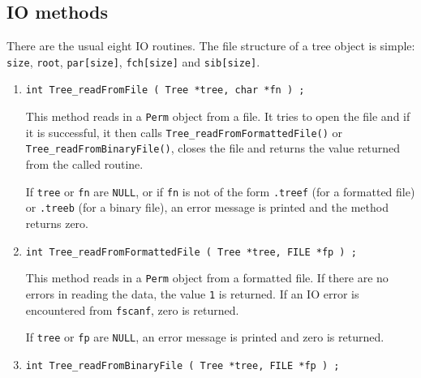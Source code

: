 \subsection{IO methods}
\label{subsection:Tree:proto:IO}
\par
There are the usual eight IO routines.
The file structure of a tree object is simple:
{\tt size},
{\tt root},
{\tt par[size]},
{\tt fch[size]} and
{\tt sib[size]}.
\par
\begin{enumerate}
\item
\begin{verbatim}
int Tree_readFromFile ( Tree *tree, char *fn ) ;
\end{verbatim}
\par
This method reads in a {\tt Perm} object from a file.
It tries to open the file and if it is successful, 
it then calls {\tt Tree\_readFromFormattedFile()} or
{\tt Tree\_readFromBinaryFile()}, 
closes the file
and returns the value returned from the called routine.
\par {}
If {\tt tree} or {\tt fn} are {\tt NULL}, 
or if {\tt fn} is not of the form
{\tt *.treef} (for a formatted file) 
or {\tt *.treeb} (for a binary file),
an error message is printed and the method returns zero.
\item
\begin{verbatim}
int Tree_readFromFormattedFile ( Tree *tree, FILE *fp ) ;
\end{verbatim}
\par
This method reads in a {\tt Perm} object from a formatted file.
If there are no errors in reading the data, 
the value {\tt 1} is returned.
If an IO error is encountered from {\tt fscanf}, zero is returned.
\par {}
If {\tt tree} or {\tt fp} are {\tt NULL}, 
an error message is printed and zero is returned.
\item
\begin{verbatim}
int Tree_readFromBinaryFile ( Tree *tree, FILE *fp ) ;
\end{verbatim}

\end{enumerate}
